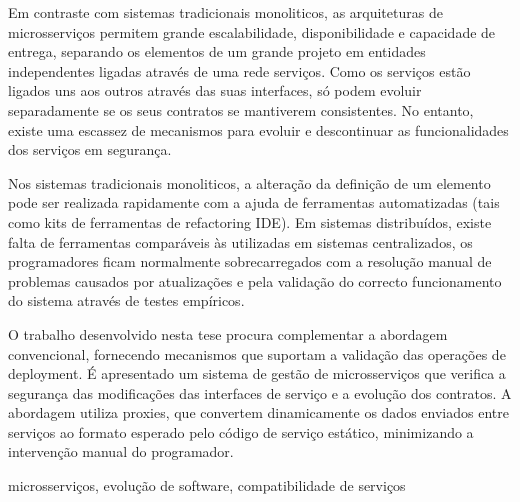 
%

Em contraste com sistemas tradicionais monoliticos, as arquiteturas de microsserviços
permitem grande escalabilidade, disponibilidade e capacidade de entrega, separando os
elementos de um grande projeto em entidades independentes ligadas através de uma rede
serviços. Como os serviços estão ligados uns aos outros através das suas interfaces, só
podem evoluir separadamente se os seus contratos se mantiverem consistentes. No
entanto, existe uma escassez de mecanismos para evoluir e descontinuar as
funcionalidades dos serviços em segurança.

Nos sistemas tradicionais monoliticos, a alteração da definição de um elemento pode ser
realizada rapidamente com a ajuda de ferramentas automatizadas (tais como kits de
ferramentas de refactoring IDE). Em sistemas distribuídos, existe falta de ferramentas
comparáveis às utilizadas em sistemas centralizados, os programadores ficam normalmente
sobrecarregados com a resolução manual de problemas causados por atualizações e pela
validação do correcto funcionamento do sistema através de testes empíricos.

O trabalho desenvolvido nesta tese procura complementar a abordagem convencional,
fornecendo mecanismos que suportam a validação das operações de deployment. É
apresentado um sistema de gestão de microsserviços que verifica a segurança das
modificações das interfaces de serviço e a evolução dos contratos. A abordagem utiliza proxies,
que convertem dinamicamente os dados enviados entre serviços ao formato esperado pelo
código de serviço estático, minimizando a intervenção manual do programador.

\begin{keywords}
    microsserviços, evolução de software, compatibilidade de serviços
\end{keywords}
